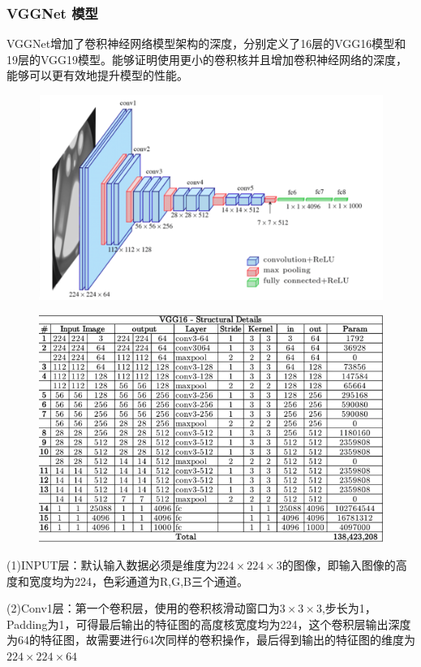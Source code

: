 \documentclass[openbib]{article}
\begin{document}
\subsubsection{VGGNet 模型}
VGGNet增加了卷积神经网络模型架构的深度，分别定义了16层的VGG16模型和19层的VGG19模型。能够证明使用更小的卷积核并且增加卷积神经网络的深度，能够可以更有效地提升模型的性能。
\begin{figure}[htbp]
	\centering
	\includegraphics[scale=0.38]{VGGNet1}
\end{figure}

\begin{figure}[htbp]
	\centering
	\includegraphics[scale=0.4]{VGGNet2}
\end{figure}

(1)INPUT层：默认输入数据必须是维度为$224\times224\times3$的图像，即输入图像的高度和宽度均为224，色彩通道为R,G,B三个通道。

(2)Conv1层：第一个卷积层，使用的卷积核滑动窗口为$3\times3\times3$,步长为1，Padding为1，可得最后输出的特征图的高度核宽度均为224，这个卷积层输出深度为64的特征图，故需要进行64次同样的卷积操作，最后得到输出的特征图的维度为$224\times224\times64$
\end{document}
